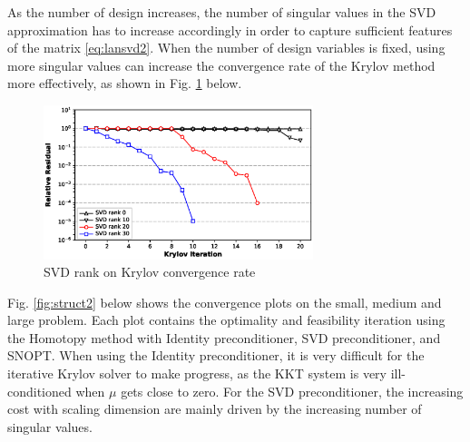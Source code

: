 \documentclass{article}
\theoremstyle{definition}
\begin{document}
As the number of design increases, the number of singular values in the SVD approximation has to increase accordingly in order to capture sufficient features of the matrix \eqref{eq:lansvd2}. When the number of design variables is fixed, using more singular values can increase the convergence rate of the Krylov method more effectively, as shown in Fig. \ref{fig:svdrank} below.
\begin{figure}[H]
  \centering
  \includegraphics[width=0.7\textwidth]{./figs/svd_rank.eps}
  \caption{SVD rank on Krylov convergence rate}
  \label{fig:svdrank}
\end{figure}

Fig. \ref{fig:struct2} below shows the convergence plots on the small, medium and large problem. Each plot contains the optimality and feasibility iteration using the Homotopy method with Identity preconditioner, SVD preconditioner, and SNOPT.  When using the Identity preconditioner, it is very difficult for the iterative Krylov solver to make progress, as the KKT system is very ill-conditioned when $\mu$ gets close to zero. For the SVD preconditioner, the increasing cost with scaling dimension are mainly driven by the increasing number of singular values. 
\end{document}
